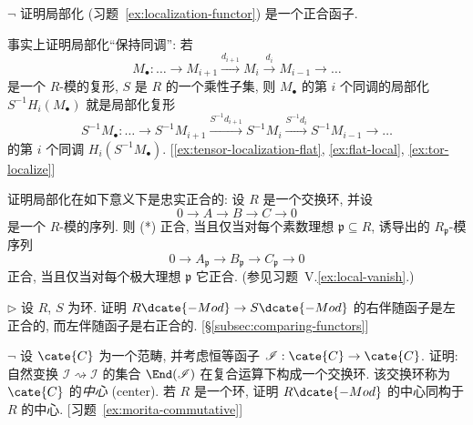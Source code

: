 \begin{prob}\label{ex:localization-exact}
$\neg$ 证明局部化 (习题~\ref{ex:localization-functor}) 是一个正合函子.

事实上证明局部化``保持同调'': 若
\[
M_{\bullet}:\dots\longrightarrow M_{i+1}\xrightarrow{d_{i+1}}M_i\xrightarrow{d_i}M_{i-1}\longrightarrow\dots
\]
是一个 $R$-模的复形, $S$ 是 $R$ 的一个乘性子集, 则 $M_{\bullet}$ 的第 $i$ 个同调的局部化 $S^{-1}H_i(M_{\bullet})$ 就是局部化复形
\[
S^{-1}M_{\bullet}:\dots\longrightarrow S^{-1}M_{i+1}\xrightarrow{S^{-1}d_{i+1}}S^{-1}M_i\xrightarrow{S^{-1}d_i}S^{-1}M_{i-1}\longrightarrow\dots
\]
的第 $i$ 个同调 $H_i(S^{-1}M_{\bullet})$.
[\ref{ex:tensor-localization-flat}, \ref{ex:flat-local}, \ref{ex:tor-localize}]
\end{prob}

\begin{prob}\label{ex:localization-faithfully-exact}
证明局部化在如下意义下是忠实正合的: 设 $R$ 是一个交换环, 并设
\begin{equation*}\tag{*}
0\longrightarrow A\longrightarrow B\longrightarrow C\longrightarrow 0
\end{equation*}
是一个 $R$-模的序列. 则 (*) 正合, 当且仅当对每个素数理想 $\mathfrak{p}\subseteq R$, 诱导出的 $R_{\mathfrak{p}}$-模序列
\[
0\longrightarrow A_{\mathfrak{p}}\longrightarrow B_{\mathfrak{p}}\longrightarrow C_{\mathfrak{p}}\longrightarrow 0
\]
正合, 当且仅当对每个极大理想 $\mathfrak{p}$ 它正合. (参见习题~V.\ref{ex:local-vanish}.)
\end{prob}

\begin{prob}\label{ex:right-adjoint-leftexact}
$\triangleright$ 设 $R$, $S$ 为环. 证明 $R\dcate{-Mod}\to S\dcate{-Mod}$ 的右伴随函子是左正合的, 而左伴随函子是右正合的. [\S\ref{subsec:comparing-functors}]
\end{prob}

\begin{prob}\label{ex:center-of-category}
$\neg$ 设 $\cate{C}$ 为一个范畴, 并考虑恒等函子 $\mathscr{I}:\cate{C}\to\cate{C}$. 证明: 自然变换 $\mathscr{I}\rightsquigarrow\mathscr{I}$ 的集合 $\End(\mathscr{I})$ 在复合运算下构成一个交换环. 该交换环称为 $\cate{C}$ 的\emph{中心} (center). 若 $R$ 是一个环, 证明 $R\dcate{-Mod}$ 的中心同构于 $R$ 的中心. [习题~\ref{ex:morita-commutative}]
\end{prob}

